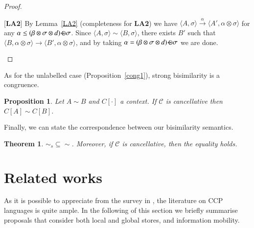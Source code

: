 \documentclass[preprint,12pt]{elsarticle}
\newtheorem{proof}{Proof}
\newtheorem{proposition}{Proposition}
\newtheorem{theorem}{Theorem}
\def\odiv{\, {\ominus\hspace{-7.7pt} \div} \,}
\begin{document}
\begin{proof}
\begin{description}
		\item{[{\bf LA2}]}
		By Lemma~\ref{LA2} (completeness for {\bf LA2}) we have $\langle A,  \sigma \rangle  \xrightarrow{\alpha}\langle A', \alpha \otimes \sigma \rangle$
		for any $\alpha \leq (\beta \otimes \sigma \otimes d) \odiv \sigma$.
		Since $\langle A,\sigma \rangle \sim \langle B,\sigma \rangle$, 
		there exists $B'$ such that 
		$\langle B, \alpha \otimes \sigma \rangle \xrightarrow{} \langle B', \alpha \otimes \sigma \rangle$,
		and by taking $\alpha = (\beta \otimes \sigma \otimes d) \odiv \sigma$ we are done.
	\end{description}
\end{proof}

As for the unlabelled case (Proposition~\ref{cong1}), strong bisimilarity is a congruence.

\begin{proposition}
	Let $A \sim B$ and $C[\cdot]$ a context.
	If $\mathcal{C}$ is cancellative 
	then $C[A] \sim C[B]$.
\end{proposition}

%
Finally, we can state the correspondence between our bisimilarity semantics.

\begin{theorem}
	$\sim_{\mathit{s}} \subseteq \sim$. Moreover, if $\mathcal{C}$ is cancellative, then the equality holds.
\end{theorem}



\section{Related works}\label{sec:related}
As it is possible to appreciate from the survey in \cite{emerging}, the literature on CCP languages is quite ample. In the following of this section  we briefly summarise proposals that consider both local and global stores, and information mobility.
\end{document}
